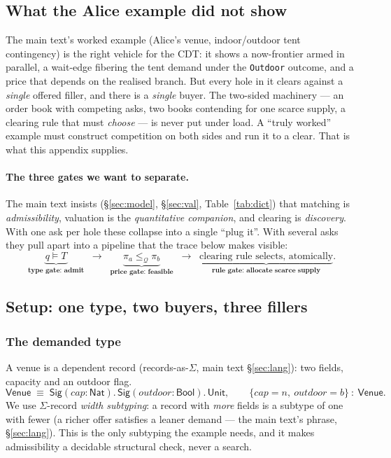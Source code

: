 \documentclass[11pt]{article}
\theoremstyle{definition}
\newcommand{\CDT}{\textsf{CDT}}
\newcommand{\Qval}{\mathcal{Q}}            %
\newcommand{\modelsT}{\models}
\newcommand{\Venue}{\textsf{Venue}}
\begin{document}
\subsection{What the Alice example did not show}
The main text's worked example (Alice's venue, indoor/outdoor tent contingency) is the right vehicle
for the \CDT{}: it shows a now-frontier armed in parallel, a wait-edge fibering the tent demand under
the \texttt{Outdoor} outcome, and a price that depends on the realised branch. But every hole in it
clears against a \emph{single} offered filler, and there is a \emph{single} buyer. The two-sided
machinery --- an order book with competing asks, two books contending for one scarce supply, a
clearing rule that must \emph{choose} --- is never put under load. A ``truly worked'' example must
construct competition on both sides and run it to a clear. That is what this appendix supplies.

\paragraph{The three gates we want to separate.} The main text insists (\S\ref{sec:model}, \S\ref{sec:val}, Table~\ref{tab:dict}) that
matching is \emph{admissibility}, valuation is the \emph{quantitative companion}, and clearing is
\emph{discovery}. With one ask per hole these collapse into a single ``plug it''. With several asks
they pull apart into a pipeline that the trace below makes visible:
\[
\underbrace{q \modelsT T}_{\textbf{type gate: admit}}\;\;\longrightarrow\;\;
\underbrace{\pi_a \le_\Qval \pi_b}_{\textbf{price gate: feasible}}\;\;\longrightarrow\;\;
\underbrace{\text{clearing rule selects, atomically}}_{\textbf{rule gate: allocate scarce supply}}.
\]

\subsection{Setup: one type, two buyers, three fillers}\label{sec:setup}

\subsubsection{The demanded type}
A venue is a dependent record (records-as-$\Sigma$, main text \S\ref{sec:lang}): two fields, capacity and an
outdoor flag.
\[
\Venue \;\equiv\; \textsf{Sig}(\mathit{cap}:\textsf{Nat}).\,\textsf{Sig}(\mathit{outdoor}:\textsf{Bool}).\,\textsf{Unit},
\qquad
\{\mathit{cap}{=}n,\ \mathit{outdoor}{=}b\}\ :\ \Venue.
\]
We use $\Sigma$-record \emph{width subtyping}: a record with \emph{more} fields is a subtype of one
with fewer (a richer offer satisfies a leaner demand --- the main text's phrase, \S\ref{sec:lang}). This is the
only subtyping the example needs, and it makes admissibility a decidable structural check, never a
search.
\end{document}
